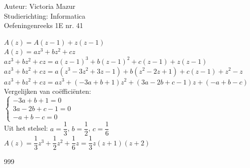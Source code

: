 \documentclass[a4paper]{article}
\begin{document}
  
\noindent \large Auteur: Victoria Mazur \\
\noindent \large Studierichting: Informatica\\
\noindent \large Oefeningenreeks 1E nr. 41\\

\medskip

\normalsize

$A(z) = A(z - 1) + z(z - 1)$ \\

$A(z) = az^3 + bz^2 + cz$ \\

$az^3 + bz^2 + cz = a(z - 1)^3 + b(z - 1)^2 + c(z - 1) + z(z - 1)$ \\

$az^3 + bz^2 + cz = a(z^3 - 3z^2 + 3z - 1) + b(z^2 - 2z + 1) + c(z - 1) + z^2 - z$ \\

$az^3 + bz^2 + cz = az^3 + (-3a + b + 1)z^2 + (3a - 2b + c - 1)z + (-a + b - c)$ \\

Vergelijken van co\"effici\"enten: \\

$\left\{
\begin{array}{l}
-3a + b + 1 = 0 \\
3a - 2b + c - 1 = 0 \\
-a + b - c = 0
\end{array}
\right.$ \\

Uit het stelsel: $a = \dfrac{1}{3}$, $b = \dfrac{1}{2}$, $c = \dfrac{1}{6}$ \\

$A(z) = \dfrac{1}{3}z^3 + \dfrac{1}{2}z^2 + \dfrac{1}{6}z = \dfrac{1}{3}z(z + 1)(z + 2)$ \\

\begin{thebibliography}{999}
\end{thebibliography}
\end{document}
